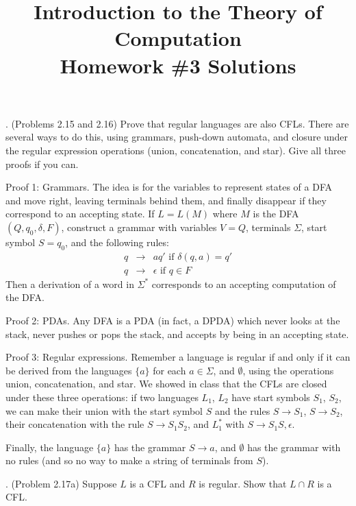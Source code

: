 \documentclass[12pt]{article}
\begin{document}
\newcommand{\N}{{\Bbb N}}
\newcommand{\eps}{\epsilon}

\title{Introduction to the Theory of Computation \\ Homework \#3 Solutions}
\date{}
\maketitle

\vspace{-1.5cm}

. (Problems 2.15 and 2.16) Prove that regular languages are also CFLs.  There are several ways to do this, using grammars, push-down automata, and closure under the regular expression operations (union, concatenation, and star).  Give all three proofs if you can.

Proof 1: Grammars.  The idea is for the variables to represent states of a DFA and move right, leaving terminals behind them, and finally disappear if they correspond to an accepting state.  If $L=L(M)$ where $M$ is the DFA $(Q,q_0,\delta,F)$, construct a grammar with variables $V=Q$, terminals $\Sigma$, start symbol $S = q_0$, and the following rules:
\begin{eqnarray*} 
q & \to & aq' \mbox{ if } \delta(q,a) = q' \\
q & \to & \eps \mbox{ if } q \in F
\end{eqnarray*}
Then a derivation of a word in $\Sigma^*$ corresponds to an accepting computation of the DFA. \smallskip

Proof 2: PDAs.  Any DFA is a PDA (in fact, a DPDA) which never looks at the stack, never pushes or pops the stack, and accepts by being in an accepting state. \smallskip

Proof 3: Regular expressions.  Remember a language is regular if and only if it can be derived from the languages $\{a\}$ for each $a \in \Sigma$, and $\emptyset$, using the operations union, concatenation, and star.  We showed in class that the CFLs are closed under these three operations: if two languages $L_1$, $L_2$ have start symbols $S_1$, $S_2$, we can make their union with the start symbol $S$ and the rules $S \to S_1$, $S \to S_2$, their concatenation with the rule $S \to S_1 S_2$, and $L_1^*$ with $S \to S_1 S, \eps$.  

Finally, the language $\{a\}$ has the grammar $S \to a$, and $\emptyset$ has the grammar with no rules (and so no way to make a string of terminals from $S$).

\medskip
{}. (Problem 2.17a) Suppose $L$ is a CFL and $R$ is regular.  Show that $L \cap R$ is a CFL.
\end{document}
